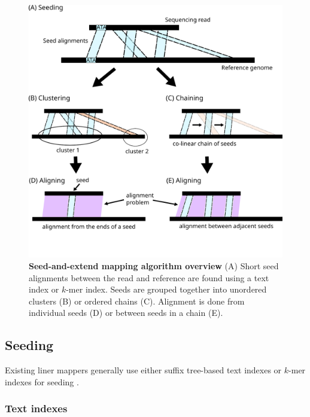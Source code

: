 \documentclass[11pt]{ucscthesis}
\begin{document}
\begin{figure}
\centering
\includegraphics[width=0.8\columnwidth]{mapping_algorithm_overview.pdf}
\caption[Seed-and-extend mapping algorithm overview]{\textbf{Seed-and-extend mapping algorithm overview} (A) Short seed alignments between the read and reference are found using a text index or $k$-mer index. Seeds are grouped together into unordered clusters (B) or ordered chains (C). Alignment is done from individual seeds (D) or between seeds in a chain (E).}
\label{fig:mapping_overview}
\end{figure}
\subsection{Seeding}

Existing liner mappers generally use either suffix tree-based text indexes or $k$-mer indexes for seeding \cite{li_survey_2010,lr_review_2023}.


\subsubsection{Text indexes}
\end{document}
